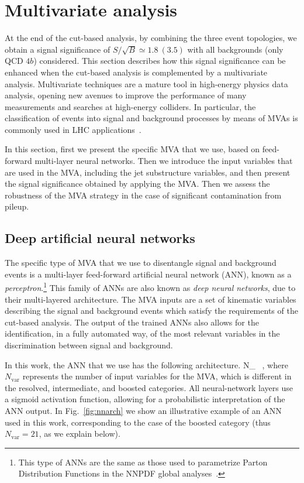 \section{Multivariate analysis}
\label{sec:mva}

At the end of the cut-based analysis,
by combining the three event topologies,
we obtain a signal significance of $S/\sqrt{B}\simeq 1.8~(3.5)$
with all backgrounds (only QCD $4b$) considered.
%
This section describes how this signal significance
 can be enhanced when the cut-based analysis
 is complemented by a multivariate analysis.
%
 Multivariate techniques are a mature tool
 in high-energy physics data analysis, opening
 new avenues to improve the performance
of many measurements and searches at high-energy colliders.
%
In particular, the classification of events into
signal and
background processes by means of MVAs is
commonly used in LHC
applications~\cite{Baldi:2014pta,Aaltonen:2012qt,
  Wardrope:2014kya,Chatrchyan:2013zna,Dall'Osso:2015aia}.

In this section, first we present the specific MVA that we use,
based on feed-forward multi-layer neural networks.
%
Then we introduce the input variables that are
used in the MVA, including the jet substructure
variables, and then present the signal significance obtained
by applying the MVA.
%
Then we assess the robustness of the MVA strategy in
the case of significant contamination from pileup.

\subsection{Deep artificial neural networks}

%
The specific type of  MVA that we use to
disentangle signal and background events is
a multi-layer feed-forward artificial neural network (ANN),
known as a {\it perceptron}.\footnote{This type of ANNs are the same
  as those used to parametrize Parton Distribution Functions
in the NNPDF global analyses~\cite{DelDebbio:2004qj,Ball:2008by,Ball:2011mu,Ball:2010de}.}
%
This family of ANNs are also known as {\it deep neural networks},
due to their multi-layered architecture.
%
The MVA inputs are a set of kinematic variables describing the
signal and background
events which satisfy the requirements of the
cut-based analysis.
%
The output of the trained ANNs also allows for the identification,
in a fully automated way,
of the most relevant variables in the discrimination between 
signal and background.

In this work, the ANN that we use has the following architecture.
\be
\label{eq:nn1}
N_{} \, ,
\ee
where $N_{\mathrm{var}}$ represents the number of input variables for the MVA,
which is different in the resolved, intermediate, and boosted categories.
%
All neural-network layers use a sigmoid activation function, allowing
for a probabilistic
interpretation of the ANN output.
%
In Fig.~\ref{fig:nnarch} we show an illustrative
example of an ANN used in this work, corresponding 
to the case of the boosted category (thus $N_{\mathrm{var}}=21$, as we explain below).

